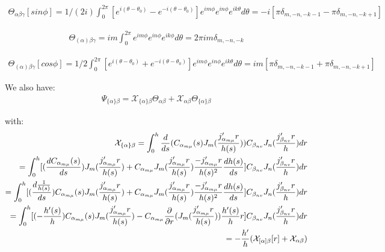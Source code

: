 \documentclass{Note}
\begin{document}
\begin{equation}
\begin{aligned}
\Theta_{\alpha\beta\gamma}[sin\phi]=1/(2i) \int_0^{2\pi} [e^{i(\theta-\theta_0)}-e^{-i(\theta-\theta_0)}]  e^{im\phi} e^{in\phi}  e^{ik\theta} d\theta
=-i[\pi \delta_{m,-n,-k-1}-\pi \delta_{m,-n,-k+1}]
\end{aligned}
\end{equation}

\begin{equation}
\begin{aligned}
\Theta_{(\alpha)\beta\gamma}=im \int_0^{2\pi} e^{im\phi} e^{in\phi}  e^{ik\phi} d\theta
=2\pi im\delta_{m,-n,-k}
\end{aligned}
\end{equation}

\begin{equation}
\begin{aligned}
\Theta_{(\alpha)\beta\gamma}[cos\phi]=1/2 \int_0^{2\pi} [e^{i(\theta-\theta_0)}+e^{-i(\theta-\theta_0)}]  e^{im\phi} e^{in\phi}  e^{ik\theta} d\theta
=im[\pi \delta_{m,-n,-k-1}+\pi \delta_{m,-n,-k+1}]
\end{aligned}
\end{equation}

We also have:
\begin{equation}
\begin{aligned}
\Psi_{\{\alpha\}\beta}=\mathcal{X}_{\{\alpha\}\beta}\Theta_{\alpha\beta}+\mathcal{X}_{\alpha\beta}\Theta_{\{\alpha\}\beta}
\end{aligned}
\end{equation}

with:
\begin{equation}
\begin{aligned}
\mathcal{X}_{\{\alpha\}\beta}=\int_0^h {d\over ds}(C_{\alpha_{m\mu}}(s) J_m({j'_{\alpha_{m\mu}}r\over h(s)}))C_{\beta_{nv}} J_n({j'_{\beta_{nv}}r\over h})dr\\
=\int_0^h [({dC_{\alpha_{m\mu}}(s)\over ds})J_m({j'_{\alpha_{m\mu}}r\over h(s)})+
C_{\alpha_{m\mu}} J_m({j'_{\alpha_{m\mu}}r\over h(s)}) {-j'_{\alpha_{m\mu}}r\over h(s)^2}{dh(s)\over ds}]C_{\beta_{nv}} J_n({j'_{\beta_{nv}}r\over h})dr\\
=\int_0^h [({d{1\over h(s)}\over ds}){C_{\alpha_{m\mu}}(s)} J_m({j'_{\alpha_{m\mu}}r\over h(s)})+
C_{\alpha_{m\mu}} J_m({j'_{\alpha_{m\mu}}r\over h(s)}) {-j'_{\alpha_{m\mu}}r\over h(s)^2}{dh(s)\over ds}]C_{\beta_{nv}} J_n({j'_{\beta_{nv}}r\over h})dr\\
=\int_0^h [(-{h'(s)\over h}){C_{\alpha_{m\mu}}(s) } J_m({j'_{\alpha_{m\mu}}r\over h(s)})-
C_{\alpha_{m\mu}} {\partial \over \partial r}(J_m({j'_{\alpha_{m\mu}}r\over h(s)})) {h'(s)\over h}r]C_{\beta_{nv}} J_n({j'_{\beta_{nv}}r\over h})dr\\
=-{h'\over h}(\mathcal{X}_{[\alpha]\beta}[r]+\mathcal{X}_{\alpha\beta})
\end{aligned}
\end{equation}
\end{document}
